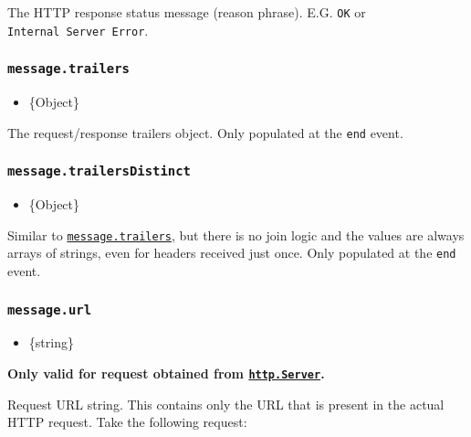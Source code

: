 The HTTP response status message (reason phrase). E.G. \texttt{OK} or
\texttt{Internal\ Server\ Error}.

\subsubsection{\texorpdfstring{\texttt{message.trailers}}{message.trailers}}\label{message.trailers}

\begin{itemize}
\tightlist
\item
  \{Object\}
\end{itemize}

The request/response trailers object. Only populated at the
\texttt{\textquotesingle{}end\textquotesingle{}} event.

\subsubsection{\texorpdfstring{\texttt{message.trailersDistinct}}{message.trailersDistinct}}\label{message.trailersdistinct}

\begin{itemize}
\tightlist
\item
  \{Object\}
\end{itemize}

Similar to \hyperref[messagetrailers]{\texttt{message.trailers}}, but
there is no join logic and the values are always arrays of strings, even
for headers received just once. Only populated at the
\texttt{\textquotesingle{}end\textquotesingle{}} event.

\subsubsection{\texorpdfstring{\texttt{message.url}}{message.url}}\label{message.url}

\begin{itemize}
\tightlist
\item
  \{string\}
\end{itemize}

\textbf{Only valid for request obtained from
\hyperref[class-httpserver]{\texttt{http.Server}}.}

Request URL string. This contains only the URL that is present in the
actual HTTP request. Take the following request:

\begin{Shaded}
\begin{Highlighting}[]
\end{Highlighting}
\end{Shaded}

